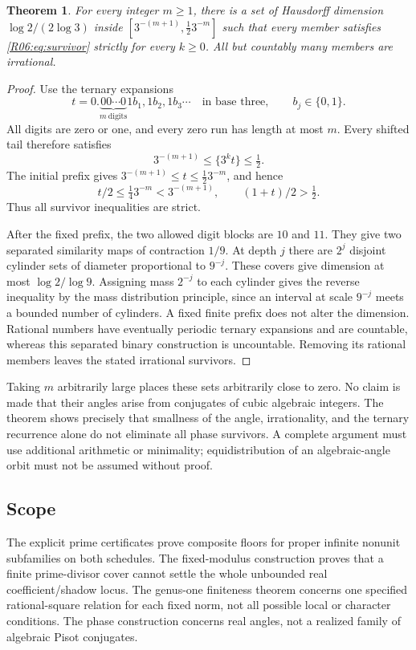 \documentclass[11pt,a4paper]{article}
\newtheorem{theorem}{Theorem}[section]
\theoremstyle{definition}\newtheorem{definition}[theorem]{Definition}
\theoremstyle{remark}\newtheorem{remark}[theorem]{Remark}
\begin{document}
\begin{theorem}\label{R06:thm:phase}
For every integer $m\ge1$, there is a set of Hausdorff dimension
$\log2/(2\log3)$ inside
$[3^{-(m+1)},\tfrac12 3^{-m}]$ such that every member satisfies
\eqref{R06:eq:survivor} strictly for every $k\ge0$.
All but countably many members are irrational.
\end{theorem}
\begin{proof}
Use the ternary expansions
\[
 t=0.\underbrace{00\cdots0}_{m\ \mathrm{digits}}
       1b_1,1b_2,1b_3\cdots\quad\text{in base three},
 \qquad b_j\in\{0,1\}.
\]
All digits are zero or one, and every zero run has length at most
$m$. Every shifted tail therefore satisfies
\[
 3^{-(m+1)}\le\{3^kt\}\le\tfrac12.
\]
The initial prefix gives
$3^{-(m+1)}\le t\le\tfrac12 3^{-m}$, and hence
\[
 t/2\le\tfrac14 3^{-m}<3^{-(m+1)},\qquad
 (1+t)/2>\tfrac12.
\]
Thus all survivor inequalities are strict.

After the fixed prefix, the two allowed digit blocks are $10$ and
$11$. They give two separated similarity maps of contraction $1/9$.
At depth $j$ there are $2^j$ disjoint cylinder sets of diameter
proportional to $9^{-j}$. These covers give dimension at most
$\log2/\log9$. Assigning mass $2^{-j}$ to each cylinder gives the
reverse inequality by the mass distribution principle, since an
interval at scale $9^{-j}$ meets a bounded number of cylinders.
A fixed finite prefix does not alter the dimension.
Rational numbers have eventually periodic ternary expansions and
are countable, whereas this separated binary construction is
uncountable. Removing its rational members leaves the stated
irrational survivors.
\end{proof}

Taking $m$ arbitrarily large places these sets arbitrarily close
to zero. No claim is made that their angles arise from conjugates
of cubic algebraic integers. The theorem shows precisely that
smallness of the angle, irrationality, and the ternary recurrence
alone do not eliminate all phase survivors. A complete argument
must use additional arithmetic or minimality; equidistribution of
an algebraic-angle orbit must not be assumed without proof.

\subsection{Scope}

The explicit prime certificates prove composite floors for proper
infinite nonunit subfamilies on both schedules. The fixed-modulus
construction proves that a finite prime-divisor cover cannot settle
the whole unbounded real coefficient/shadow locus. The genus-one
finiteness theorem concerns one specified rational-square relation
for each fixed norm, not all possible local or character conditions.
The phase construction concerns real angles, not a realized family
of algebraic Pisot conjugates.
\end{document}
